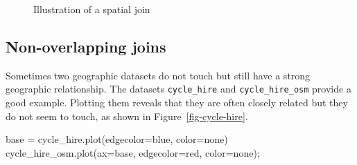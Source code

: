 \documentclass[
  letterpaper,
]{krantz}
\newenvironment{Shaded}{\begin{snugshade}}{\end{snugshade}}
\newcommand{\NormalTok}[1]{\textcolor[rgb]{0.00,0.23,0.31}{#1}}
\newcommand{\OperatorTok}[1]{\textcolor[rgb]{0.37,0.37,0.37}{#1}}
\newcommand{\StringTok}[1]{\textcolor[rgb]{0.13,0.47,0.30}{#1}}
\begin{document}
\begin{figure}

\begin{minipage}{0.50\linewidth}



\end{minipage}%
%
\begin{minipage}{0.50\linewidth}



\end{minipage}%
\newline
\begin{minipage}{0.50\linewidth}



\end{minipage}%

\caption{\label{fig-spatial-join}Illustration of a spatial join}

\end{figure}%

\subsection{Non-overlapping joins}\label{non-overlapping-joins}

Sometimes two geographic datasets do not touch but still have a strong
geographic relationship. The datasets \texttt{cycle\_hire} and
\texttt{cycle\_hire\_osm} provide a good example. Plotting them reveals
that they are often closely related but they do not seem to touch, as
shown in Figure~\ref{fig-cycle-hire}.

\begin{Shaded}
\begin{Highlighting}[]
\NormalTok{base }\OperatorTok{=}\NormalTok{ cycle\_hire.plot(edgecolor}\OperatorTok{=}\StringTok{\textquotesingle{}blue\textquotesingle{}}\NormalTok{, color}\OperatorTok{=}\StringTok{\textquotesingle{}none\textquotesingle{}}\NormalTok{)}
\NormalTok{cycle\_hire\_osm.plot(ax}\OperatorTok{=}\NormalTok{base, edgecolor}\OperatorTok{=}\StringTok{\textquotesingle{}red\textquotesingle{}}\NormalTok{, color}\OperatorTok{=}\StringTok{\textquotesingle{}none\textquotesingle{}}\NormalTok{)}\OperatorTok{;}
\end{Highlighting}
\end{Shaded}
\end{document}
